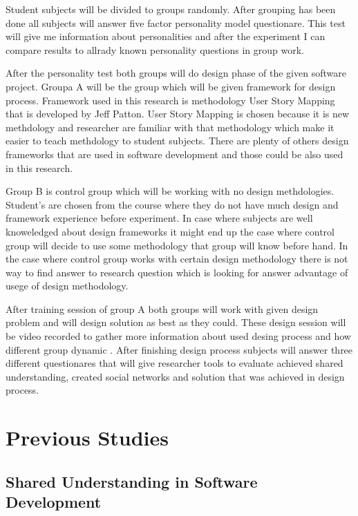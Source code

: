 \documentclass[english]{tktltiki2}
\theoremstyle{definition}
\theoremstyle{remark}
\begin{document}
Student subjects will be divided to groups randomly. After grouping has been done all subjects will answer five factor personality model questionare\cite{fiveFactor}. This test will give me information about personalities and after the experiment I can compare results to allrady known personality questions in group work.

After the personality test both groups will do design phase of the given software project. Groupa A will be the group which will be given framework for design process. Framework used in this research is methodology User Story Mapping that is developed by Jeff Patton\cite{userStoryMapping}. User Story Mapping is chosen because it is new methdology and researcher are familiar with that methodology which make it easier to teach methdology to student subjects. There are plenty of others design frameworks that are used in software development and those could be also used in this research.

Group B is control group which will be working with no design methdologies. Student's are chosen from the course where they do not have much design and framework experience before experiment. In case where subjects are well knoweledged about design frameworks it might end up the case where control group will decide to use some methodology that group will know before hand. In the case where control group works with certain design methodology there is not way to find answer to research question which is looking for answer advantage of usege of design methodology.

After training session of group A both groups will work with given design problem and will design solution as best as they could. These design session will be video recorded to gather more information about used desing process and how different group dynamic . After finishing design process subjects will answer three different questionares that will give researcher tools to evaluate achieved shared understanding, created social networks and solution that was achieved in design process.


\section{Previous Studies}

\subsection{Shared Understanding in Software Development}
\end{document}
